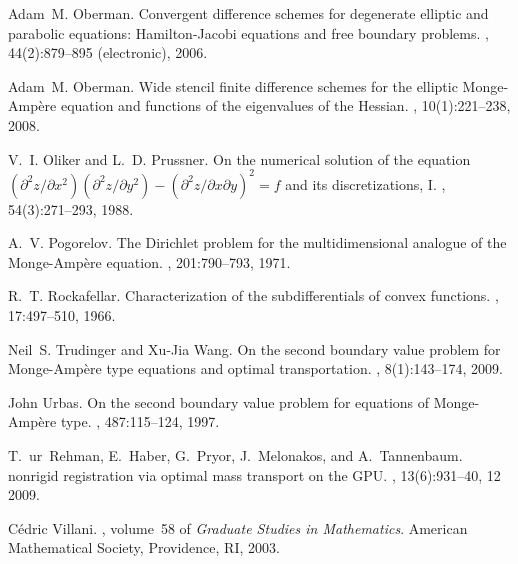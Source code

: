 \documentclass{amsart}
\theoremstyle{lemma}
\theoremstyle{remark}
\begin{document}
\begin{thebibliography}{CKKSE97}
Adam~M. Oberman.
\newblock Convergent difference schemes for degenerate elliptic and parabolic
  equations: {H}amilton-{J}acobi equations and free boundary problems.
, 44(2):879--895 (electronic), 2006.

Adam~M. Oberman.
\newblock Wide stencil finite difference schemes for the elliptic
  {M}onge-{A}mp\`ere equation and functions of the eigenvalues of the
  {H}essian.
, 10(1):221--238, 2008.

V.~I. Oliker and L.~D. Prussner.
\newblock On the numerical solution of the equation $(\partial^2z/\partial
  x^2)(\partial^2z/\partial y^2)-(\partial^2z/\partial x\partial y)^2=f$ and
  its discretizations, {I}.
, 54(3):271--293, 1988.

A.~V. Pogorelov.
\newblock The {D}irichlet problem for the multidimensional analogue of the
  {M}onge-{A}mp\`ere equation.
, 201:790--793, 1971.

R.~T. Rockafellar.
\newblock Characterization of the subdifferentials of convex functions.
, 17:497--510, 1966.

Neil~S. Trudinger and Xu-Jia Wang.
\newblock On the second boundary value problem for {M}onge-{A}mp\`ere type
  equations and optimal transportation.
, 8(1):143--174, 2009.

John Urbas.
\newblock On the second boundary value problem for equations of
  {M}onge-{A}mp\`ere type.
, 487:115--124, 1997.

T.~ur~Rehman, E.~Haber, G.~Pryor, J.~Melonakos, and A.~Tannenbaum.
 nonrigid registration via optimal mass transport on the {GPU}.
, 13(6):931--40, 12 2009.

C{\'e}dric Villani.
, volume~58 of {\em Graduate
  Studies in Mathematics}.
\newblock American Mathematical Society, Providence, RI, 2003.

\end{thebibliography}
\end{document}
